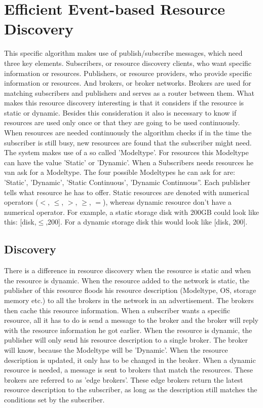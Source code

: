 	\section{Efficient Event-based Resource Discovery}
		This specific algorithm makes use of publish/subscribe messages, which need three key elements.
		Subscribers, or resource discovery clients, who want specific information or resources. Publishers, or 
		resource providers, who provide specific information or resources. And brokers, or broker networks.
		Brokers are used for matching subscribers and publishers and serves as a router between them.
		What makes this resource discovery interesting is that it considers if the resource is static or 
		dynamic. Besides this consideration it also is necessary to know if resources are used only once or 
		that they are going to be used continuously. When resources are needed continuously the algorithm 
		checks if in the time the subscriber is still busy, new resources are found that the subscriber might 
		need. The system makes use of a so called 'Modeltype'. For resources this Modeltype can have the 
		value 'Static' or 'Dynamic'. When a Subscribers needs resources he van ask for a Modeltype. The four 
		possible Modeltypes he can ask for are: 'Static', 'Dynamic', 'Static Continuous', 'Dynamic 
		Continuous''. Each publisher tells what resource he has to offer. Static resources are denoted with 
		numerical operators ($<$, $\le$, $>$, $\ge$, $=$), whereas dynamic resource don't have a numerical operator. For 
		example, a static storage disk with 200GB could look like this: [disk,$\le$,200]. For a dynamic storage 
		disk this would look like [disk, 200].
		\subsection{Discovery}
		There is a difference in resource discovery when the resource is static and when the resource is 
		dynamic. When the resource added to the network is static, the publisher of this resource floods his 
		resource description (Modeltype, OS, storage memory etc.) to all the brokers in the network in an 
		advertisement. The brokers then cache this resource information. When a subscriber wants a specific 
		resource, all it has to do is send a message to the broker and the broker will reply with the resource 
		information he got earlier. When the resource is dynamic, the publisher will only send his resource 
		description to a single broker. The broker will know, because the Modeltype will be 'Dynamic'. When 
		the resource description is updated, it only has to be changed in the broker. When a dynamic 
		resource is needed, a message is sent to brokers that match the resources. These brokers are 
		referred to as 'edge brokers'. These edge brokers return the latest resource description to the 
		subscriber, as long as the description still matches the conditions set by the subscriber.
